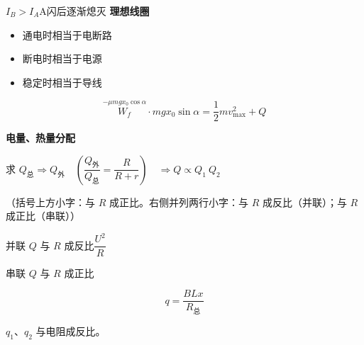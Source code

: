 $I_B>I_A$\quad A闪后逐渐熄灭
\textbf{理想线圈}
\begin{itemize}
\item 通电时相当于电断路 %
\item 断电时相当于电源
\item 稳定时相当于导线
\end{itemize}
\begin{problem}

\begin{solution}
\[
\overset{-\mu mgx_0\cos\alpha}{W_f}\cdot mgx_0\sin\alpha=\frac{1}{2}mv_{\max}^2+Q
\] %

\textbf{电量、热量分配}

求 $Q_{\text{总}}\Rightarrow Q_{\text{外}}$\ \ $\left(\dfrac{Q_{\text{外}}}{Q_{\text{总}}}=\dfrac{R}{R+r}\right)$\ \ $\Rightarrow Q\propto Q_1\ Q_2$ %

（括号上方小字：与 $R$ 成正比。右侧并列两行小字：与 $R$ 成反比（并联）；与 $R$ 成正比（串联））

并联 $Q$ 与 $R$ 成反比\quad $\dfrac{U^2}{R}$

串联 $Q$ 与 $R$ 成正比

\[
q=\frac{BLx}{R_{\text{总}}}
\]

$q_1$、$q_2$ 与电阻成反比。
\end{solution}
\end{problem}
